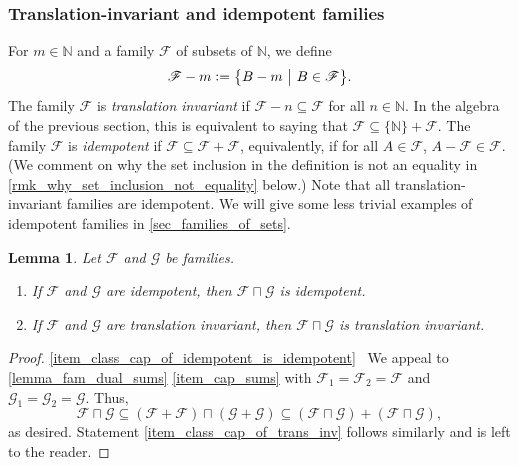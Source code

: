 \documentclass[letter,11pt]{article}
\theoremstyle{plain}
\newtheorem{lemma}[theorem]{Lemma}
\theoremstyle{definition}
\theoremstyle{plain}
\theoremstyle{plain}
\numberwithin{equation}{section}
\newcommand{\N}{\mathbb{N}}
\newcommand{\defeq}{\vcentcolon=}
\newcommand{\filter}{\mathscr{F}}
\newcommand{\classcap}{\sqcap}
\newcommand{\family}{\mathscr{F}}
\newcommand{\familyone}{\mathscr{F}}
\newcommand{\familytwo}{\mathscr{G}}
\begin{document}
\subsubsection{Translation-invariant and idempotent families}
\label{sec_trans_inv_and_idempotent_families}

For $m \in \N$ and a family $\family$ of subsets of $\N$, we define
\[\family - m \defeq \big\{ B - m \ \big| \ B \in \family \big\}.\]
The family $\family$ is \emph{translation invariant} if $\family - n \subseteq \family$ for all $n \in \N$. In the algebra of the previous section, this is equivalent to saying that $\family \subseteq \{\N\} + \family$.  The family $\filter$ is \emph{idempotent} if $\filter \subseteq \filter + \filter$, equivalently, if for all $A \in \filter$, $A - \filter \in \filter$. (We comment on why the set inclusion in the definition is not an equality in \cref{rmk_why_set_inclusion_not_equality} below.) Note that all translation-invariant families are idempotent.  We will give some less trivial examples of idempotent families in \cref{sec_families_of_sets}.



\begin{lemma}
\label{lemma_idempotent_classcap_is_idempotent}
    Let $\family$ and $\familytwo$ be families.
    \begin{enumerate}
        \item
        \label{item_class_cap_of_idempotent_is_idempotent}
        If $\family$ and $\familytwo$ are idempotent, then $\family \classcap \familytwo$ is idempotent.

        \item
        \label{item_class_cap_of_trans_inv}
        If $\family$ and $\familytwo$ are translation invariant, then $\family \classcap \familytwo$ is translation invariant.
    \end{enumerate}
\end{lemma}

\begin{proof}
    \eqref{item_class_cap_of_idempotent_is_idempotent} \ We appeal to \cref{lemma_fam_dual_sums} \eqref{item_cap_sums} with $\familyone_1 = \familyone_2 = \familyone$ and $\familytwo_1 = \familytwo_2 = \familytwo$.  Thus,
    \[\familyone \classcap \familytwo \subseteq (\familyone + \familyone) \classcap (\familytwo + \familytwo) \subseteq (\familyone \classcap \familytwo) + (\familyone \classcap \familytwo),\]
    as desired.  Statement \eqref{item_class_cap_of_trans_inv} follows similarly and is left to the reader.
\end{proof}
\end{document}
